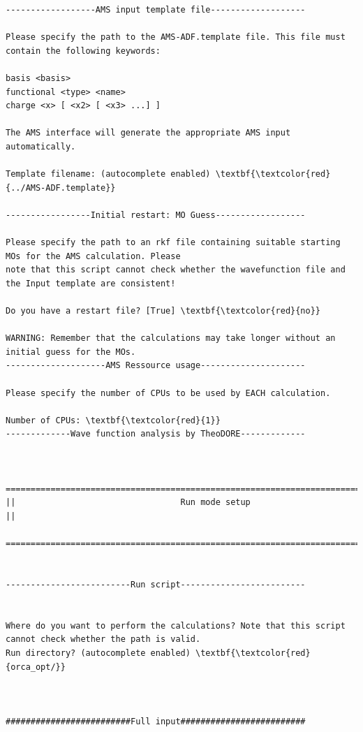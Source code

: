 \documentclass[a4paper,11pt,DIV=15,openany]{scrbook}
\begin{document}
\begin{oframed}
\begin{Verbatim}[commandchars=\\\{\}]
------------------AMS input template file-------------------

Please specify the path to the AMS-ADF.template file. This file must contain the following keywords:

basis <basis>
functional <type> <name>
charge <x> [ <x2> [ <x3> ...] ]

The AMS interface will generate the appropriate AMS input automatically.

Template filename: (autocomplete enabled) \textbf{\textcolor{red}{../AMS-ADF.template}}

-----------------Initial restart: MO Guess------------------

Please specify the path to an rkf file containing suitable starting MOs for the AMS calculation. Please 
note that this script cannot check whether the wavefunction file and the Input template are consistent!

Do you have a restart file? [True] \textbf{\textcolor{red}{no}}

WARNING: Remember that the calculations may take longer without an initial guess for the MOs.
--------------------AMS Ressource usage---------------------

Please specify the number of CPUs to be used by EACH calculation.

Number of CPUs: \textbf{\textcolor{red}{1}}
-------------Wave function analysis by TheoDORE-------------


  ================================================================================
||                                 Run mode setup                                 ||
  ================================================================================


-------------------------Run script-------------------------


Where do you want to perform the calculations? Note that this script cannot check whether the path is valid.
Run directory? (autocomplete enabled) \textbf{\textcolor{red}{orca_opt/}}



#########################Full input#########################


\end{Verbatim}
\end{oframed}
\end{document}
